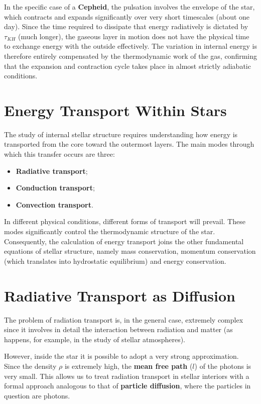 In the specific case of a \textbf{Cepheid}, the pulsation involves the envelope of the star, which contracts and expands significantly over very short timescales (about one day). Since the time required to dissipate that energy radiatively is dictated by $\tau_{KH}$ (much longer), the gaseous layer in motion does not have the physical time to exchange energy with the outside effectively. The variation in internal energy is therefore entirely compensated by the thermodynamic work of the gas, confirming that the expansion and contraction cycle takes place in almost strictly adiabatic conditions.

\section{Energy Transport Within Stars}

The study of internal stellar structure requires understanding how energy is transported from the core toward the outermost layers. The main modes through which this transfer occurs are three:
\begin{itemize}
\item \textbf{Radiative transport};
\item \textbf{Conduction transport};
\item \textbf{Convection transport}.
\end{itemize}
In different physical conditions, different forms of transport will prevail. These modes significantly control the thermodynamic structure of the star. Consequently, the calculation of energy transport joins the other fundamental equations of stellar structure, namely mass conservation, momentum conservation (which translates into hydrostatic equilibrium) and energy conservation.

\section{Radiative Transport as Diffusion}

The problem of radiation transport is, in the general case, extremely complex since it involves in detail the interaction between radiation and matter (as happens, for example, in the study of stellar atmospheres).

However, inside the star it is possible to adopt a very strong approximation. Since the density $\rho$ is extremely high, the \textbf{mean free path} ($l$) of the photons is very small. This allows us to treat radiation transport in stellar interiors with a formal approach analogous to that of \textbf{particle diffusion}, where the particles in question are photons.

